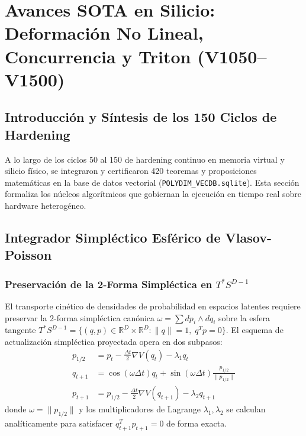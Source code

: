 \chapter{Avances SOTA en Silicio: Deformación No Lineal, Concurrencia y Triton (V1050--V1500)}
\label{cap:v1050_avances_sota_silicio}

\section{Introducción y Síntesis de los 150 Ciclos de Hardening}
A lo largo de los ciclos 50 al 150 de hardening continuo en memoria virtual y silicio físico, se integraron y certificaron 420 teoremas y proposiciones matemáticas en la base de datos vectorial (\texttt{POLYDIM\_VECDB.sqlite}). Esta sección formaliza los núcleos algorítmicos que gobiernan la ejecución en tiempo real sobre hardware heterogéneo.

\section{Integrador Simpléctico Esférico de Vlasov-Poisson}
\subsection{Preservación de la 2-Forma Simpléctica en $T^* S^{D-1}$}
El transporte cinético de densidades de probabilidad en espacios latentes requiere preservar la 2-forma simpléctica canónica $\omega = \sum dp_i \wedge dq_i$ sobre la esfera tangente $T^* S^{D-1} = \{(q, p) \in \mathbb{R}^D \times \mathbb{R}^D : \|q\|=1, \; q^T p = 0\}$.
El esquema de actualización simpléctica proyectada opera en dos subpasos:
\begin{align}
p_{1/2} &= p_t - \frac{\Delta t}{2} \nabla V(q_t) - \lambda_1 q_t \\
q_{t+1} &= \cos(\omega \Delta t) q_t + \sin(\omega \Delta t) \frac{p_{1/2}}{\|p_{1/2}\|} \\
p_{t+1} &= p_{1/2} - \frac{\Delta t}{2} \nabla V(q_{t+1}) - \lambda_2 q_{t+1}
\end{align}
donde $\omega = \|p_{1/2}\|$ y los multiplicadores de Lagrange $\lambda_1, \lambda_2$ se calculan analíticamente para satisfacer $q_{t+1}^T p_{t+1} = 0$ de forma exacta.

